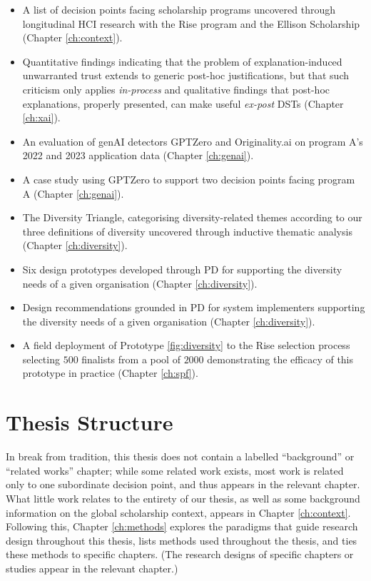 \begin{itemize}
    \item A list of decision points facing scholarship programs uncovered through longitudinal HCI research with the Rise program and the Ellison Scholarship (Chapter \ref{ch:context}).
    \item Quantitative findings indicating that the problem of explanation-induced unwarranted trust extends to generic post-hoc justifications, but that such criticism only applies \emph{in-process} and qualitative findings that post-hoc explanations, properly presented, can make useful \emph{ex-post} DSTs (Chapter \ref{ch:xai}).
    \item An evaluation of genAI detectors GPTZero and Originality.ai on program A's 2022 and 2023 application data (Chapter \ref{ch:genai}).
    \item A case study using GPTZero to support two decision points facing program A (Chapter \ref{ch:genai}).
    \item The Diversity Triangle, categorising diversity-related themes according to our three definitions of diversity uncovered through inductive thematic analysis (Chapter \ref{ch:diversity}).
    \item Six design prototypes developed through PD for supporting the diversity needs of a given organisation (Chapter \ref{ch:diversity}).
    \item Design recommendations grounded in PD for system implementers supporting the diversity needs of a given organisation (Chapter \ref{ch:diversity}).
    \item A field deployment of Prototype \ref{fig:diversity} to the Rise selection process selecting $500$ finalists from a pool of $2000$ demonstrating the efficacy of this prototype in practice (Chapter \ref{ch:spf}).
\end{itemize}

\section{Thesis Structure}
In break from tradition, this thesis does not contain a labelled ``background'' or ``related works'' chapter; while some related work exists, most work is related only to one subordinate decision point, and thus appears in the relevant chapter. What little work relates to the entirety of our thesis, as well as some background information on the global scholarship context, appears in Chapter \ref{ch:context}. Following this, Chapter \ref{ch:methods} explores the paradigms that guide research design throughout this thesis, lists methods used throughout the thesis, and ties these methods to specific chapters. (The research designs of specific chapters or studies appear in the relevant chapter.)

